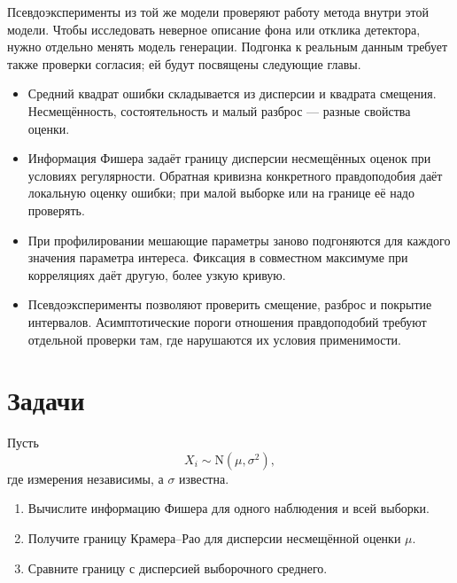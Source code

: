 \documentclass[
  russian,
  11pt,
  a4paper,
  open=any]{scrbook}
\providecommand{\tightlist}{%
  \setlength{\itemsep}{0pt}\setlength{\parskip}{0pt}}
\begin{document}
Псевдоэксперименты из той же модели проверяют работу метода внутри этой
модели. Чтобы исследовать неверное описание фона или отклика детектора,
нужно отдельно менять модель генерации. Подгонка к реальным данным
требует также проверки согласия; ей будут посвящены следующие главы.

\begin{bookchaptersummary}

\begin{itemize}
\tightlist
\item
  Средний квадрат ошибки складывается из дисперсии и квадрата смещения.
  Несмещённость, состоятельность и малый разброс --- разные свойства
  оценки.
\item
  Информация Фишера задаёт границу дисперсии несмещённых оценок при
  условиях регулярности. Обратная кривизна конкретного правдоподобия
  даёт локальную оценку ошибки; при малой выборке или на границе её надо
  проверять.
\item
  При профилировании мешающие параметры заново подгоняются для каждого
  значения параметра интереса. Фиксация в совместном максимуме при
  корреляциях даёт другую, более узкую кривую.
\item
  Псевдоэксперименты позволяют проверить смещение, разброс и покрытие
  интервалов. Асимптотические пороги отношения правдоподобий требуют
  отдельной проверки там, где нарушаются их условия применимости.
\end{itemize}

\end{bookchaptersummary}

\section{Задачи}\label{ux437ux430ux434ux430ux447ux438-9}

\begin{semanticpdfbox}[colback=BookCoralSoft,borderline west={1.2mm}{0pt}{BookCoral}]

\par\nopagebreak[4]\vspace{1.2mm}

Пусть \[
X_i\sim\mathrm N(\mu,\sigma^2),
\] где измерения независимы, а \(\sigma\) известна.

\begin{enumerate}
\def\labelenumi{\arabic{enumi}.}
\tightlist
\item
  Вычислите информацию Фишера для одного наблюдения и всей выборки.
\item
  Получите границу Крамера--Рао для дисперсии несмещённой оценки
  \(\mu\).
\item
  Сравните границу с дисперсией выборочного среднего.
\end{enumerate}

\end{semanticpdfbox}
\end{document}
